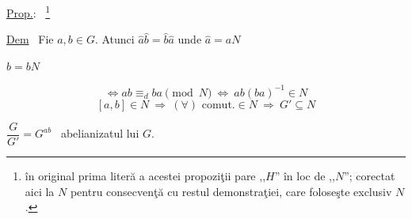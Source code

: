 \documentclass[12pt]{article}
\begin{document}
\bigskip
\noindent\underline{Prop.}: \ \footnote{în original prima literă a acestei propoziţii pare ,,$H$'' în loc de ,,$N$''; corectat aici la $N$ pentru consecvenţă cu restul demonstraţiei, care foloseşte exclusiv $N$.}

\bigskip
\noindent\underline{Dem} \ Fie $a,b\in G$. Atunci $\hat a\hat b=\hat b\hat a$ unde $\hat a=aN$

\noindent $\hat b=bN$

\[
\Leftrightarrow ab\equiv_{d} ba \pmod{N} \ \Leftrightarrow \ ab(ba)^{-1}\in N
\]
\[
[a,b]\in N \ \Rightarrow \ (\forall)\text{ comut.}\in N \ \Rightarrow \ G'\subseteq N
\]

\bigskip
\noindent $\dfrac{G}{G'} = G^{ab}$ \ abelianizatul lui $G$.
\end{document}
